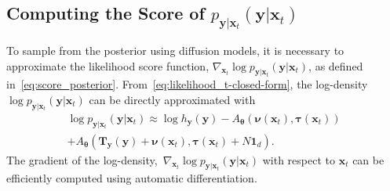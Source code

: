 \subsection{Computing the Score of $p_{\mathbf{y}|\mathbf{x}_t}(\mathbf{y}|\mathbf{x}_{t})$}
To sample from the posterior using diffusion models, it is necessary to approximate the likelihood score function, $\nabla_{\mathbf{x}_t} \log p_{\mathbf{y} \vert \mathbf{x}_t}(\mathbf{y} \vert \mathbf{x}_t)$, as defined in~\eqref{eq:score_posterior}. 
From~\eqref{eq:likelihood_t-closed-form}, the log-density $\log p_{\mathbf{y}|\mathbf{x}_t}(\mathbf{y}|\mathbf{x}_t)$ can be directly approximated with
\begin{multline*}
    \log p_{\mathbf{y}|\mathbf{x}_t}(\mathbf{y}|\mathbf{x}_{t})
     \approx \log h_{\mathbf{y}}(\mathbf{y}) - A_{\boldsymbol{\theta}}(\boldsymbol{\nu}(\mathbf{x}_t), \boldsymbol{\tau}(\mathbf{x}_t)) \\+ A_{\boldsymbol{\theta}}(\mathbf{T}_{\mathbf{y}}(\mathbf{y}) + \boldsymbol{\nu}(\mathbf{x}_t), \boldsymbol{\tau}(\mathbf{x}_t) + N \mathbf{1}_d).
\end{multline*}
The gradient of the log-density,~$\nabla_{\mathbf{x}_t} \log  p_{\mathbf{y}|\mathbf{x}_t}(\mathbf{y}|\mathbf{x}_{t})$ with respect to $\mathbf{x}_t$ can be efficiently computed using automatic differentiation.  

